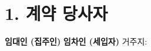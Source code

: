 \section*{1. 계약 당사자}
\textbf{임대인 (집주인)}
\ContractLandlordsKO
\vspace{0.5cm}
\textbf{임차인 (세입자)}
\ContractTenantsKO
거주지: \Propaddress
